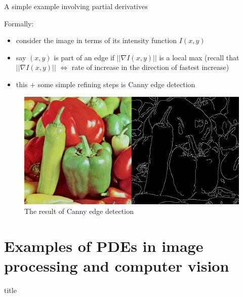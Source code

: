 \documentclass{beamer}
\begin{document}
\begin{frame}{A simple example involving partial derivatives}
    
    Formally: 
    \begin{itemize}
        \item consider the image in terms of its intensity function $I(x,y)$
        \item say $(x,y)$ is part of an edge if $||\nabla I(x,y)||$ is a local max (recall that $||\nabla I(x,y)||$ $\Longleftrightarrow$ rate of increase in the direction of fastest increase)
        \item this $+$ some simple refining steps is Canny edge detection
    \end{itemize}
    \begin{figure}[h!]
            \centering            \includegraphics[scale=0.25]{edgedetect1.png}
            \caption{The result of Canny edge detection}
    \end{figure}

\end{frame}

\section{Examples of PDEs in image processing and computer vision}

\begin{frame}
  \vfill
  \centering
  \begin{beamercolorbox}[sep=8pt,center,shadow=true,rounded=true]{title}
    \par%
  \end{beamercolorbox}
  \vfill
\end{frame}
\end{document}
